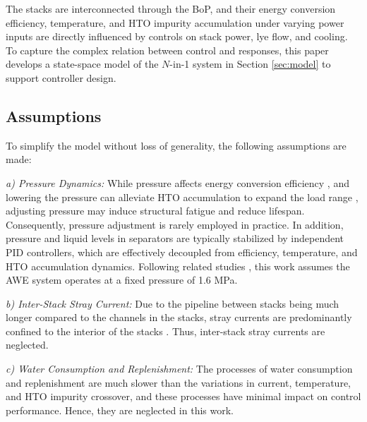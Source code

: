 \documentclass[review,3p,10pt]{elsarticle}
\begin{document}
The stacks are interconnected through the BoP, and their energy conversion efficiency, temperature, and HTO impurity accumulation under varying power inputs are directly influenced by controls on stack power, lye flow, and cooling. To capture the complex relation between control  and responses, this paper develops a state-space model of the $N$-in-1 system in Section \ref{sec:model} to support controller design.

\subsection{Assumptions}
\label{sec:assumptions}

To simplify the model without loss of generality, the following assumptions are made:

\emph{a) Pressure Dynamics:} While pressure affects energy conversion efficiency \cite{ulleberg2003modeling}, and lowering the pressure can alleviate HTO accumulation %
to expand the load range \cite{qi2021pressure}, adjusting pressure may induce structural fatigue and reduce lifespan. Consequently, pressure adjustment is rarely employed in practice. In addition, pressure and liquid levels in separators are typically stabilized by independent PID controllers, which are effectively decoupled from efficiency, temperature, and HTO accumulation dynamics. Following related studies \cite{qi2021pressure,liang2024large,li2023exploration}, this work assumes the AWE system operates at a fixed pressure of 1.6 MPa. 

\emph{b) Inter-Stack Stray Current:} Due to the pipeline between stacks being much longer compared to the channels in the stacks, stray currents are predominantly confined to the interior of the stacks \cite{dogan2024experimental}. %
Thus, inter-stack stray currents are neglected. 

\emph{c) Water Consumption and Replenishment:} The processes of water consumption and replenishment are much slower than the variations in current, temperature, and HTO impurity crossover, and these processes have minimal impact on control performance. Hence, they are neglected in this work.
\end{document}
